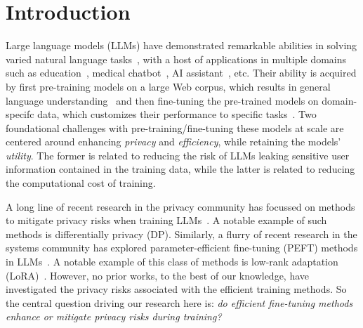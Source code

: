 \section{Introduction}


Large language models (LLMs) have demonstrated remarkable abilities in solving varied natural language tasks~\cite{naveed2023comprehensive}, with a host of applications in multiple domains such as education~\cite{wang2024large}, medical chatbot~\cite{thirunavukarasu2023large}, AI assistant~\cite{dong2023towards}, etc. 
%
Their ability is acquired by first pre-training models on a large Web corpus\cite{kaplan2020scaling}, which results in general language understanding~\cite{brown2020language} and then fine-tuning the pre-trained models on domain-specifc data, which customizes their performance to specific tasks~\cite{zhang2023instruction}. 
%
Two foundational challenges with pre-training/fine-tuning these models at scale are centered around enhancing \emph{privacy} and \emph{efficiency}, while retaining the models' \emph{utility}.  
%
The former is related to reducing the risk of LLMs leaking sensitive user information contained in the training data, while the latter is related to reducing the computational cost of training. 
%

A long line of recent research in the privacy community has focussed on methods to mitigate privacy risks when training LLMs~\cite{shi-etal-2022-selective, zhao-etal-2022-provably, 10.1145/2976749.2978318,yu2022differentiallyprivatefinetuninglanguage}. A notable example of such methods is differentially privacy (DP)\cite{10.1145/2976749.2978318}.
%
Similarly, a flurry of recent research in the systems community has explored parameter-efficient fine-tuning (PEFT) methods in  LLMs~\cite{han2024parameterefficientfinetuninglargemodels}. A notable example of this class of methods is low-rank adaptation (LoRA)~\cite{hu2022lora}.
%
However, no prior works, to the best of our knowledge, have investigated the privacy risks associated with the efficient training methods.
%
So the central question driving our research here is: \emph{do efficient fine-tuning methods enhance or mitigate privacy risks during training?}

